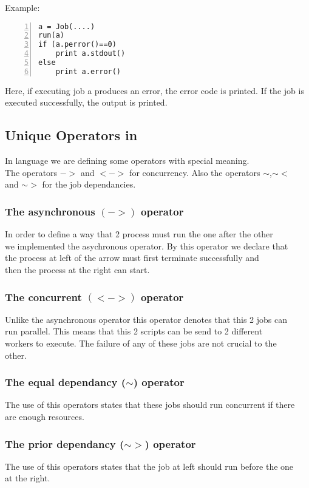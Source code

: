 Example:
\begin{Verbatim}[numbers=left]
a = Job(....)
run(a)
if (a.perror()==0)
    print a.stdout()
else
    print a.error()
\end{Verbatim}

Here, if executing job a produces an error, the error code is printed. If the job is executed successfully, the output is printed.



\subsection*{Unique Operators in \lang{}}

In \lang{} language we are defining some operators with special meaning.\\
The operators $->$ and $<->$ for concurrency. Also the operators $\sim$,$\sim<$\\and $\sim>$ for the job dependancies.\\
\subsubsection*{The asynchronous $(->)$ operator}
In order to define a way that 2 process must run the one after the other\\
we implemented the asychronous operator. By this operator we declare that\\
the process at left of the arrow must first terminate successfully and\\
then the process at the right can start.
\subsubsection*{The concurrent $(<->)$ operator}
Unlike the asynchronous operator this operator denotes that this 2 jobs can\\
run parallel. This means that this 2 scripts can be send to 2 different\\
workers to execute. The failure of any of these jobs are not crucial to the\\
other.
\subsubsection*{The equal dependancy ($\sim$) operator}
The use of this operators states that these jobs should run concurrent if there\\
are enough resources.
\subsubsection*{The prior dependancy ($\sim>$) operator}
The use of this operators states that the job at left should run before the one\\
at the right.
